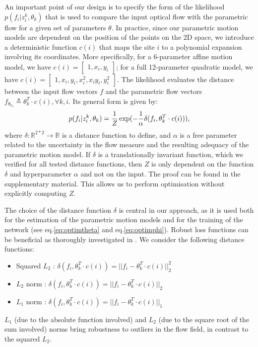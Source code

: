 \documentclass[10pt,twocolumn,letterpaper]{article}
\begin{document}
An important point of our design is to specify the form of the likelihood $p(f_i | z_i^k, \theta_k)$ that is used to compare the input optical flow with the parametric flow for a given set of parameters $\theta$. In practice, since our parametric motion models are dependent on the position of the points on the 2D space, we introduce a deterministic function $c(i)$ that maps the site $i$ to a polynomial expansion involving its coordinates. More specifically, for a 6-parameter affine motion model, we have $c(i) = \begin{bmatrix}1, x_i, y_i\end{bmatrix}$; for a full 12-parameter quadratic model, we have $c(i) = \begin{bmatrix}1, x_i, y_i, x_i^2, x_iy_i, y_i^2\end{bmatrix}$. The likelihood evaluates the distance between the input flow vectors $f$ and the parametric flow vectors $f_{{\theta_k}_i} \triangleq  \theta^T_k \cdot c(i), \forall k,i$. Its general form is given by:
\begin{equation}
\label{eq:likelihood}
p(f_i |z_i^k, \theta_k) = \frac1{Z} \exp(-{\color{black}\frac{1}{\alpha}}\delta(f_i, \theta^T_k \cdot c(i))),
\end{equation}
where $\delta :\mathbb{R}^{2*2} \to \mathbb{R}$ is a distance function to define, {\color{black} and $\alpha$ is a free parameter related to the uncertainty in the flow measure and the resulting adequacy of the parametric motion model.} If $\delta$ is a translationally invariant function, which we verified for all tested distance functions, then $Z$ is only dependent on the function $\delta$ {\color{black} and hyperparameter $\alpha$} and not on the input. The proof can be found in the supplementary material. This allows us to perform optimisation without explicitly computing $Z$.

The choice of the distance function $\delta$ is central in our approach, as it is used both for the estimation of the parametric motion models and for the training of the network (see eq.\eqref{eq:optimtheta} and eq.\eqref{eq:optimphi}). Robust loss functions can be beneficial as thoroughly investigated in \cite{barron2019}. We consider the following distance functions: 
\begin{itemize}
\item Squared $L_2$ : $\delta(f_i, \theta^T_k \cdot c(i)) = ||f_i -\theta^T_k \cdot c(i)||_2^2$
\item  $L_2$ norm : $\delta(f_i, \theta^T_k \cdot c(i)) = ||f_i -\theta^T_k \cdot c(i)||_2$
\item  $L_1$ norm : $\delta(f_i, \theta^T_k \cdot c(i)) = ||f_i -\theta^T_k \cdot c(i)||_1$
\end{itemize}
$L_1$ (due to the absolute function involved) and $L_2$ (due to the square root of the sum involved) norms bring robustness to outliers in the flow field, in contrast to the squared $L_2$.
\end{document}
